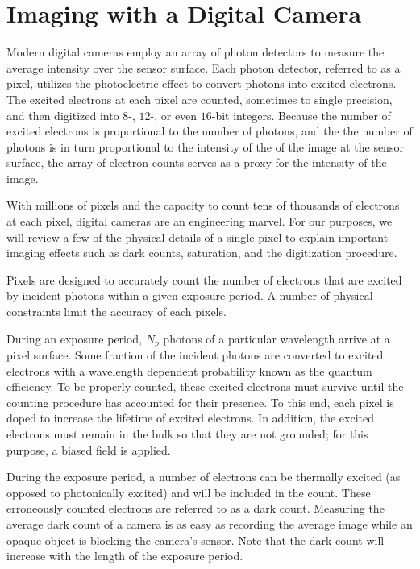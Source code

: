 \SkipTocEntry\chapter{Imaging with a Digital Camera} 
\label{app:digital_imaging}

Modern digital cameras employ an array of photon detectors to measure the
average intensity over the sensor surface. Each photon detector, referred to as a pixel,
utilizes the photoelectric effect to convert photons into excited electrons.
The excited electrons at each pixel are counted, sometimes to single precision, and
then digitized into $8$-, $12$-, or even $16$-bit integers. Because the number of
excited electrons is proportional to the number of photons, and the the number of
photons is in turn proportional to the intensity of the of the image at the
sensor surface, the array of electron counts serves as a proxy for the intensity
of the image.

With millions of pixels and the capacity to count tens of thousands of electrons at each pixel,
digital cameras are an engineering marvel. For our purposes, we will review a few of the physical
details of a single pixel to explain important imaging effects such as dark counts, saturation,
and the digitization procedure.

Pixels are designed to accurately count the number of electrons that are
excited by incident photons within a given exposure period. A number of physical constraints
limit the accuracy of each pixels.

During an exposure period, $N_p$ photons of a particular wavelength arrive at a pixel
surface. Some fraction of the incident photons are converted to excited electrons
with a wavelength dependent probability known as the quantum efficiency. To be properly
counted, these excited electrons must survive until the counting procedure has
accounted for their presence. To this end, each pixel is doped to increase the lifetime
of excited electrons. In addition, the excited electrons must remain in the bulk so that
they are not grounded; for this purpose, a biased field is applied. %

During the exposure period, a number of electrons can be thermally excited (as opposed to
photonically excited) and will be included in the count. These erroneously
counted electrons are referred to as a dark count. Measuring the average dark count of a
camera is as easy as recording the average image while an opaque object is blocking the
camera's sensor. Note that the dark count will increase with the length of the exposure
period.

